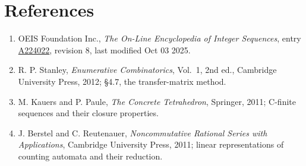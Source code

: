 \documentclass[11pt]{article}
\theoremstyle{definition}
\begin{document}
\section{References}

\begin{enumerate}

\item OEIS Foundation Inc., \emph{The On-Line Encyclopedia of Integer Sequences}, entry \href{https://oeis.org/A224022}{A224022}, revision 8, last modified Oct 03 2025.

\item R. P. Stanley, \emph{Enumerative Combinatorics}, Vol.~1, 2nd ed., Cambridge University Press, 2012; \S4.7, the transfer-matrix method.

\item M. Kauers and P. Paule, \emph{The Concrete Tetrahedron}, Springer, 2011; C-finite sequences and their closure properties.

\item J. Berstel and C. Reutenauer, \emph{Noncommutative Rational Series with Applications}, Cambridge University Press, 2011; linear representations of counting automata and their reduction.

\end{enumerate}
\end{document}
